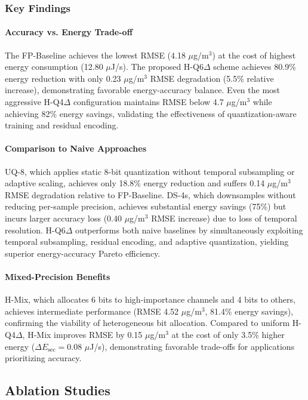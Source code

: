\subsubsection{Key Findings}

\paragraph{Accuracy vs. Energy Trade-off}
The FP-Baseline achieves the lowest RMSE (4.18 $\mu$g/m$^3$) at the cost of highest energy consumption (12.80 $\mu$J/s). The proposed H-Q6$\Delta$ scheme achieves 80.9\% energy reduction with only 0.23 $\mu$g/m$^3$ RMSE degradation (5.5\% relative increase), demonstrating favorable energy-accuracy balance. Even the most aggressive H-Q4$\Delta$ configuration maintains RMSE below 4.7 $\mu$g/m$^3$ while achieving 82\% energy savings, validating the effectiveness of quantization-aware training and residual encoding.

\paragraph{Comparison to Naive Approaches}
UQ-8, which applies static 8-bit quantization without temporal subsampling or adaptive scaling, achieves only 18.8\% energy reduction and suffers 0.14 $\mu$g/m$^3$ RMSE degradation relative to FP-Baseline. DS-4s, which downsamples without reducing per-sample precision, achieves substantial energy savings (75\%) but incurs larger accuracy loss (0.40 $\mu$g/m$^3$ RMSE increase) due to loss of temporal resolution. H-Q6$\Delta$ outperforms both naive baselines by simultaneously exploiting temporal subsampling, residual encoding, and adaptive quantization, yielding superior energy-accuracy Pareto efficiency.

\paragraph{Mixed-Precision Benefits}
H-Mix, which allocates 6 bits to high-importance channels and 4 bits to others, achieves intermediate performance (RMSE 4.52 $\mu$g/m$^3$, 81.4\% energy savings), confirming the viability of heterogeneous bit allocation. Compared to uniform H-Q4$\Delta$, H-Mix improves RMSE by 0.15 $\mu$g/m$^3$ at the cost of only 3.5\% higher energy ($\Delta E_{\text{sec}} = 0.08$ $\mu$J/s), demonstrating favorable trade-offs for applications prioritizing accuracy.

\subsection{Ablation Studies}

